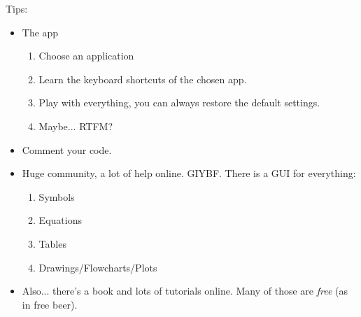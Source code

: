 \documentclass[twoside]{article}
\begin{document}
Tips:
  \begin{itemize}
  \item The app
  \begin{enumerate}
    \item Choose an application
    \item Learn the keyboard shortcuts of the chosen app.
    \item Play with everything, you can always restore the default settings.
    \item Maybe... RTFM?
  \end{enumerate}
  \item Comment your code.
  \item Huge community, a lot of help online. GIYBF. There is a GUI for everything:
  \begin{enumerate}
    \item Symbols
    \item Equations
    \item Tables
    \item Drawings/Flowcharts/Plots
  \end{enumerate}
  \item Also... there's a book and lots of tutorials online. Many of those are \emph{free} (as in free beer).
  \end{itemize}
\end{document}

